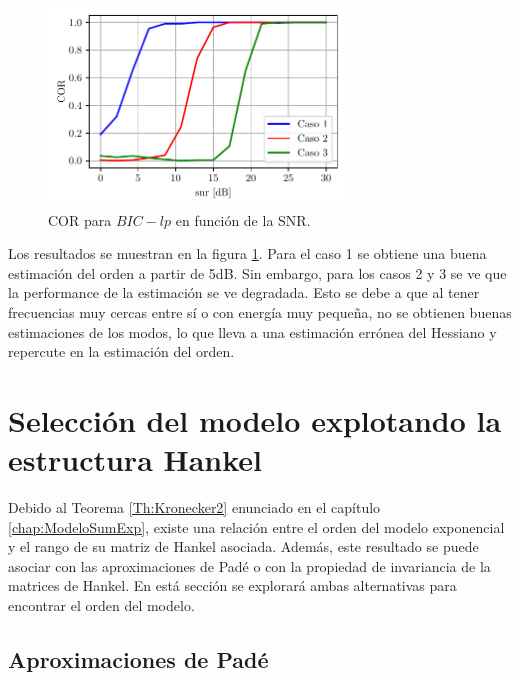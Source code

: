 \begin{figure}[ht]
	\centering
	\includegraphics[width = 0.7\textwidth]{Figuras/COR_BIC_pruebas.pdf}
	\caption{COR para $BIC-lp$ en función de la SNR.}
	\label{fig:COR_example_bic}
\end{figure}

Los resultados se muestran en la figura \ref{fig:COR_example_bic}. Para el caso 1 se obtiene una buena estimación del orden a partir de 5dB. Sin embargo, para los casos 2 y 3 se ve que la performance de la estimación se ve degradada. Esto se debe a que al tener frecuencias muy cercas entre sí o con energía muy pequeña, no se obtienen buenas estimaciones de los modos, lo que lleva a una estimación errónea del Hessiano y repercute en la estimación del orden. 


\section{Selección del modelo explotando la estructura Hankel }\label{sec:review}
	 
	Debido al Teorema \ref{Th:Kronecker2} enunciado en el  capítulo \ref{chap:ModeloSumExp}, existe una relación entre el orden del modelo exponencial y el rango de su matriz de Hankel asociada. Además, este resultado se puede asociar con las aproximaciones de Padé o con la propiedad de invariancia de la matrices de Hankel. En está sección se explorará ambas alternativas para encontrar el orden del modelo.

\subsection{Aproximaciones de Padé}

